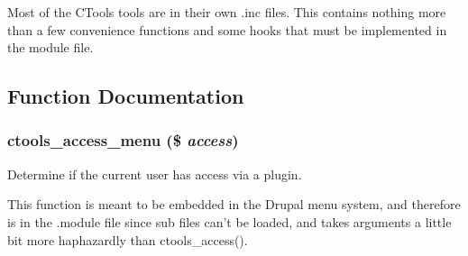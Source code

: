 Most of the CTools tools are in their own .inc files. This contains nothing more than a few convenience functions and some hooks that must be implemented in the module file. 

\subsection{Function Documentation}
\hypertarget{ctools_8module_ae5b8ef5c7720e6aee33ff8e15d8dacbd}{
\subsubsection[{ctools\_\-access\_\-menu}]{\setlength{\rightskip}{0pt plus 5cm}ctools\_\-access\_\-menu (\$ {\em access})}}
\label{ctools_8module_ae5b8ef5c7720e6aee33ff8e15d8dacbd}
Determine if the current user has access via a plugin.

This function is meant to be embedded in the Drupal menu system, and therefore is in the .module file since sub files can't be loaded, and takes arguments a little bit more haphazardly than ctools\_\-access().


